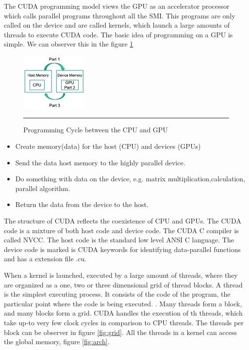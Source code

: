 The CUDA programming model views the GPU as an accelerator processor which calls parallel programs  throughout all the SMI. This programs are only called on the device and are called kernels, which launch a large amounts of threads to execute CUDA code. The basic idea of programming on a GPU is simple. We can observer this in the figure \ref{fig:cycle}

\begin{figure}[htbp]
	\centering
		\includegraphics[width=0.3\textwidth]{Figures/cycle.png}
		\rule{35em}{0.5pt}
	\caption[Programming Cycle]{Programming Cycle between the CPU and GPU}
	\label{fig:cycle}
\end{figure}


\begin{itemize}
\item Create memory(data) for the host (CPU) and devices (GPUs)
\item Send the data host memory to the highly parallel device.
\item Do something with data on the device, e.g. matrix multiplication,calculation, parallel algorithm.
\item Return the data from the device to the host.
\end{itemize}

The structure of CUDA reflects the coexistence of CPU and GPUs. The CUDA code is a mixture of both host code and device code. The CUDA C compiler is called NVCC. The host code is the standard low level ANSI C language. The device code is marked is CUDA keywords for identifying data-parallel functions and has a extension file .cu.

When a kernel is launched, executed by a large amount of threads, where they are organized as a one, two or three dimensional grid of thread blocks. A thread is the simplest executing process. It consists of the code of the program, the particular point where the code is being executed. \cite{hwu}. Many threads form a block, and many blocks form a grid. CUDA handles the execution of th threads, which take up-to very few clock cycles in comparison to CPU threads. The threads per block can be observer in figure \ref{fig:grid}. All the threads in a kernel can access the global memory, figure \ref{fig:arch}.

